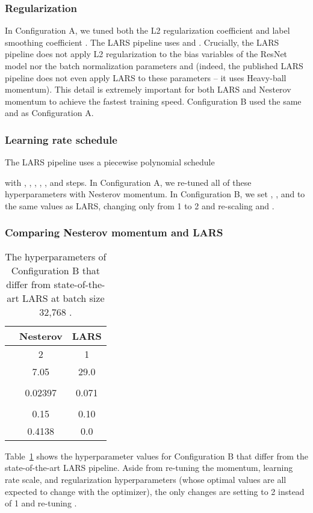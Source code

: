 \documentclass{article}
\begin{document}
\subsubsection{Regularization}\label{sec:regularization}

In Configuration A, we tuned both the L2 regularization coefficient  and label smoothing coefficient  \citep{szegedy2016rethinking}. The LARS pipeline uses  and .
Crucially, the LARS pipeline does not apply L2 regularization to the bias variables of the ResNet model nor the batch normalization parameters  and  (indeed, the published LARS pipeline does not even apply LARS to these parameters -- it uses Heavy-ball momentum). This detail is extremely important for both LARS and Nesterov momentum to achieve the fastest training speed. Configuration B used the same  and  as Configuration A.

\subsubsection{Learning rate schedule}\label{sec:learning-rate}

The LARS pipeline uses a piecewise polynomial schedule

with , , , , , and  steps. In Configuration A, we re-tuned all of these hyperparameters with Nesterov momentum. In Configuration B, we set , , and  to the same values as LARS, changing only  from 1 to 2 and re-scaling  and .

\subsubsection{Comparing Nesterov momentum and LARS}\label{sec:nesterov-vs-lars}


\begin{table}[t]
\centering
\setlength{\extrarowheight}{3.5pt}
\begin{tabular}{|c|c|c|}
\hline
 & Nesterov & LARS \\ \hline
 & 2 & 1 \\ \hline
 & 7.05 & 29.0 \\ \hline
 &  &  \\ \hline
 & 0.02397 & 0.071 \\ \hline
 &  &  \\ \hline
 & 0.15 & 0.10 \\ \hline
 & 0.4138 & 0.0 \\ \hline
\end{tabular}
\caption{The hyperparameters of Configuration B that differ from state-of-the-art LARS at batch size 32,768 \citep{kumar2019scale}.}\label{table:best_nesterov_lars_hparams_resnet50}
\end{table}
Table~\ref{table:best_nesterov_lars_hparams_resnet50} shows the hyperparameter values for Configuration B that differ from the state-of-the-art LARS pipeline. Aside from re-tuning the momentum, learning rate scale, and regularization hyperparameters (whose optimal values are all expected to change with the optimizer), the only changes are setting  to 2 instead of 1 and re-tuning .
\end{document}
